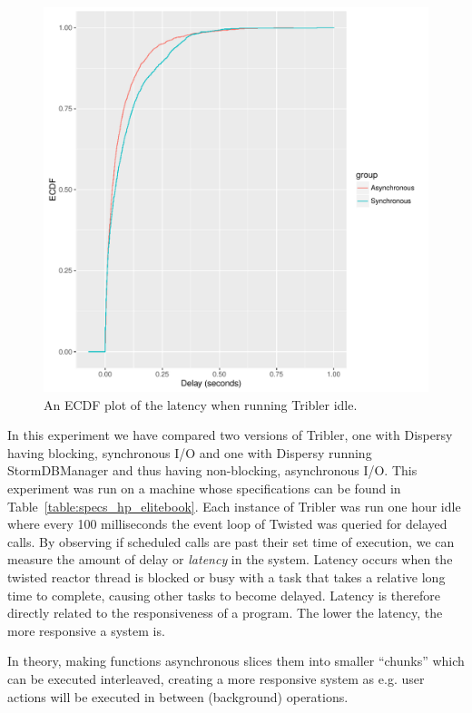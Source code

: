 \begin{figure}[!h]
	\centering
	\includegraphics[width=\linewidth]{experimentation/images/ecdf_latency_idle}
	\caption{An ECDF plot of the latency when running Tribler idle.}
	\label{fig:ecdf_latency_idle}
\end{figure} 

In this experiment we have compared two versions of Tribler, one with Dispersy having blocking, synchronous I/O and one with Dispersy running StormDBManager and thus having non-blocking, asynchronous I/O.
This experiment was run on a machine whose specifications can be found in Table~\ref{table:specs_hp_elitebook}.
Each instance of Tribler was run one hour idle where every 100 milliseconds the event loop of Twisted was queried for delayed calls.
By observing if scheduled calls are past their set time of execution, we can measure the amount of delay or \emph{latency} in the system.
Latency occurs when the twisted reactor thread is blocked or busy with a task that takes a relative long time to complete, causing other tasks to become delayed.
Latency is therefore directly related to the responsiveness of a program.
The lower the latency, the more responsive a system is.

In theory, making functions asynchronous slices them into smaller \enquote{chunks} which can be executed interleaved, creating a more responsive system as e.g. user actions will be executed in between (background) operations.

